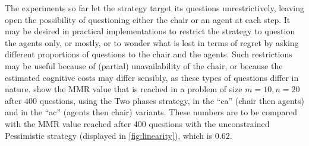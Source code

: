 \documentclass[sigconf, anonymous]{aamas}
\begin{document}



The experiments so far let the strategy target its questions unrestrictively, leaving open the possibility of questioning either the chair or an agent at each step. It may be desired in practical implementations to restrict the strategy to question the agents only, or mostly, or to wonder what is lost in terms of regret by asking different proportions of questions to the chair and the agents. Such restrictions may be useful because of (partial) unavailability of the chair, or because the estimated cognitive costs may differ sensibly, as these types of questions differ in nature.  show the MMR value that is reached in a problem of size $m = 10, n = 20$ after $400$ questions, using the Two phases strategy, in the “ca” (chair then agents) and in the “ac” (agents then chair) variants. These numbers are to be compared with the MMR value reached after 400 questions with the unconstrained Pessimistic strategy (displayed in \cref{fig:linearity}), which is $0.62$.%
\end{document}

